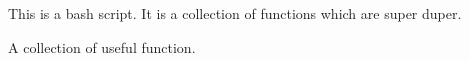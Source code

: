 This is a bash script. It is a collection of functions which are super duper.
\begin{theorem}[func.sh] A collection of useful function.

\end{theorem}
